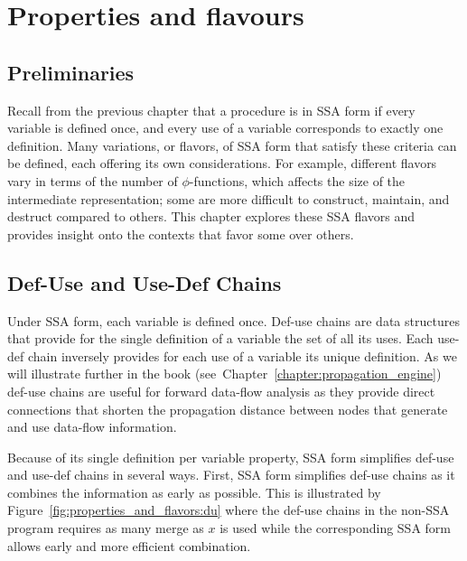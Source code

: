 \chapter{Properties and flavours }
\label{chap:properties_and_flavours}
\graphicspath{{Figs/}{properties_and_flavours/Figs/}{part1/properties_and_flavours/Figs/}}


\section{Preliminaries}

Recall from the previous chapter that a procedure is in SSA form if
every variable is defined once, and every use of a variable corresponds
to exactly one definition. Many variations, or flavors, of SSA form that 
satisfy these criteria can be defined, each offering its own considerations.
For example, different flavors vary in terms of the number of $\phi$-functions,
which affects the size of the intermediate representation; some are more difficult to construct, maintain, and destruct
compared to others. This chapter explores these SSA flavors and provides
insight onto the contexts that favor some over others. 

\section{Def-Use and Use-Def Chains}
Under SSA form, each variable is defined once. Def-use chains are data structures that provide for the single definition of a variable the set of all its uses. Each use-def chain inversely provides for each use of a variable its unique definition. As we will illustrate further in the book (see~Chapter~\ref{chapter:propagation_engine}) def-use chains are useful for forward data-flow analysis as they provide direct connections that shorten the propagation distance between nodes that generate and use data-flow information. 

Because of its single definition per variable property, SSA form simplifies def-use and use-def chains in several ways. First, SSA form simplifies def-use chains as it combines the information as early as possible.
This is illustrated by Figure~\ref{fig:properties_and_flavors:du} where the def-use chains in the non-SSA program requires as many merge as $x$ is used while the corresponding SSA form allows early and more efficient combination. 

